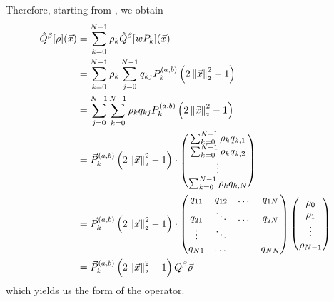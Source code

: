 Therefore, starting from , we obtain
\begin{align*}
  \hat{Q}^\beta[\rho](\vec{x}) & = \sum_{k=0}^{N-1} \rho_k \hat{Q}^\beta[wP_k](\vec{x})       \\
                               & = \sum_{k=0}^{N-1} \rho_k \sum_{j=0}^{N-1} q_{kj} P_{k}^{(a, b)}\left(2 \left\lVert\vec{x}\right\rVert_{\scriptscriptstyle 2}^2 - 1\right) \\
                               & = \sum_{j=0}^{N-1} \sum_{k=0}^{N-1} \rho_k q_{kj} P_{k}^{(a, b)}\left(2 \left\lVert\vec{x}\right\rVert_{\scriptscriptstyle 2}^2 - 1\right) \\
                               & = \vec{P}_{k}^{(a, b)}\left(2 \left\lVert\vec{x}\right\rVert_{\scriptscriptstyle 2}^2 - 1\right) \cdot \begin{pmatrix}
                                                         \sum_{k=0}^{N-1} \rho_k q_{k,1} \\
                                                         \sum_{k=0}^{N-1} \rho_k q_{k,2} \\
                                                         \vdots                          \\
                                                         \sum_{k=0}^{N-1} \rho_k q_{k,N}
                                                       \end{pmatrix}        \\
                               & = \vec{P}_{k}^{(a, b)}\left(2 \left\lVert\vec{x}\right\rVert_{\scriptscriptstyle 2}^2 - 1\right) \cdot \begin{pmatrix}
                                                         q_{11} & q_{12} & \dots & q_{1N} \\
                                                         q_{21} & \ddots & \dots & q_{2N} \\
                                                         \vdots & \ddots &       &        \\
                                                         q_{N1} & \dots  &       & q_{NN} \\
                                                       \end{pmatrix} \begin{pmatrix}
                                                                       \rho_0 \\
                                                                       \rho_1 \\
                                                                       \vdots \\
                                                                       \rho_{N-1}
                                                                     \end{pmatrix}       \\
                               & = \vec{P}_{k}^{(a, b)}\left(2 \left\lVert\vec{x}\right\rVert_{\scriptscriptstyle 2}^2 - 1\right) Q^\beta \vec{\rho}
\end{align*}
which yields us the form of the operator.

\pagebreak
